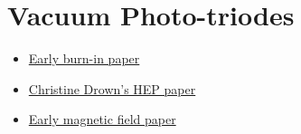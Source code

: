 
\section{Vacuum Photo-triodes}
\label{sec:eq_vpt}

\begin{itemize}
\item \href{papers/VPT Burn-in}{Early burn-in paper}
\item \href{papers/VPT_Phys393}{Christine Drown's HEP paper}
\item \href{papers/0102083v1-1}{Early magnetic field paper}
\end{itemize}

